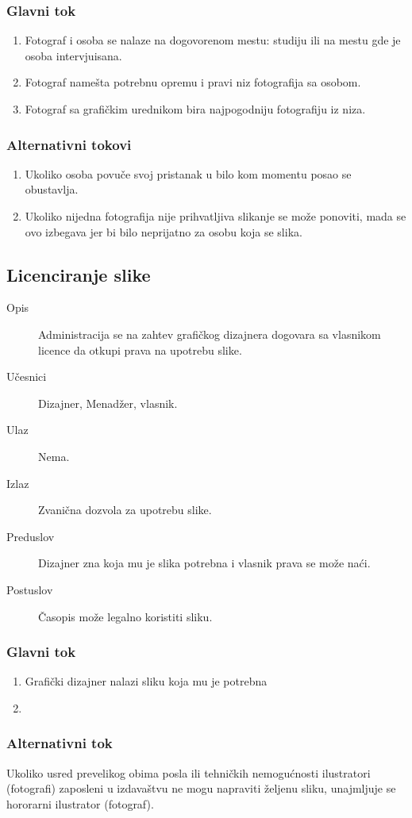 \subsubsection{Glavni tok}
\begin{enumerate} 
\item Fotograf i osoba se nalaze na dogovorenom mestu: studiju ili na mestu gde je osoba intervjuisana.
\item Fotograf namešta potrebnu opremu i pravi niz fotografija sa osobom.
\item Fotograf sa grafičkim urednikom bira najpogodniju fotografiju iz niza.
\end{enumerate}
\subsubsection{Alternativni tokovi}
\begin{enumerate} 
\item Ukoliko osoba povuče svoj pristanak u bilo kom momentu posao se obustavlja.
\item Ukoliko nijedna fotografija nije prihvatljiva slikanje se može ponoviti, mada se ovo izbegava jer bi bilo neprijatno za osobu koja se slika.
\end{enumerate}

\subsection{Licenciranje slike}
\begin{description}
\item [Opis] Administracija se na zahtev grafičkog dizajnera dogovara sa vlasnikom licence da otkupi prava na upotrebu slike.
\item [Učesnici] Dizajner, Menadžer, vlasnik.
\item [Ulaz] Nema.
\item [Izlaz] Zvanična dozvola za upotrebu slike.
\item [Preduslov] Dizajner zna koja mu je slika potrebna i vlasnik prava se može naći.
\item [Postuslov] Časopis može legalno koristiti sliku.
\end{description}
\subsubsection{Glavni tok}
\begin{enumerate} 
\item Grafički dizajner nalazi sliku koja mu je potrebna
\item 
\end{enumerate}
\subsubsection{Alternativni tok}
Ukoliko usred prevelikog obima posla ili tehničkih nemogućnosti ilustratori (fotografi) zaposleni u izdavaštvu ne mogu napraviti željenu sliku, unajmljuje se hororarni ilustrator (fotograf).